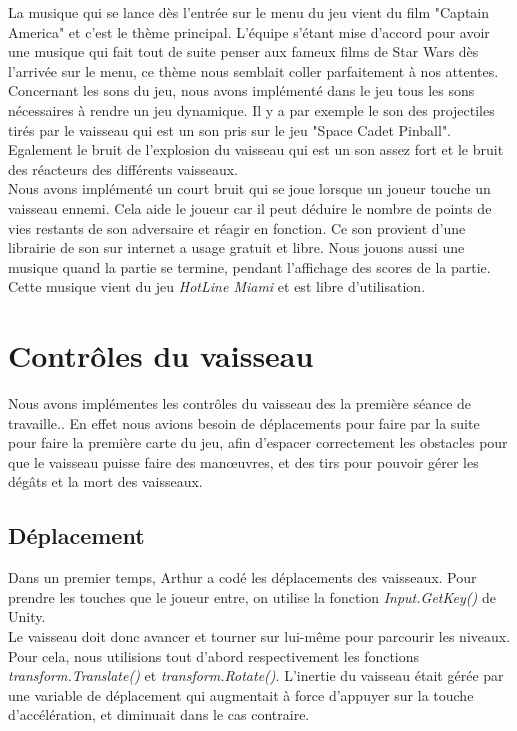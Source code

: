 \documentclass[12pt, titlepage]{article}
\begin{document}
\begin{spacing}{1.5}
La musique qui se lance dès l’entrée sur le menu du jeu vient du film "Captain America" et c’est le thème principal. L’équipe s’étant mise d’accord pour avoir une musique qui fait tout de suite penser aux fameux films de Star Wars dès l’arrivée sur le menu, ce thème nous semblait coller parfaitement à nos attentes. \\

Concernant les sons du jeu, nous avons implémenté dans le jeu tous les sons nécessaires à rendre un jeu dynamique. Il y a par exemple le son des projectiles tirés par le vaisseau qui est un son pris sur le jeu "Space Cadet Pinball". Egalement le bruit de l’explosion du vaisseau qui est un son assez fort et le bruit des réacteurs des différents vaisseaux. \\

Nous avons implémenté un court bruit qui se joue lorsque un joueur touche un vaisseau ennemi. Cela aide le joueur car il peut déduire le nombre de points de vies restants de son adversaire et réagir en fonction. Ce son provient d'une librairie de son sur internet a usage gratuit et libre. Nous jouons aussi une musique quand la partie se termine, pendant l'affichage des scores de la partie. Cette musique vient du jeu \textit{HotLine Miami} et est libre d'utilisation. \\


\newpage
\section{Contrôles du vaisseau}

Nous avons implémentes les contrôles du vaisseau des la première séance de travaille.. En effet nous avions besoin de déplacements pour faire par la suite pour faire la première carte du jeu, afin d'espacer correctement les obstacles pour que le vaisseau puisse faire des man\oe uvres, et des tirs pour pouvoir gérer les dégâts et la mort des vaisseaux.\\

\subsection{Déplacement}

Dans un premier temps, Arthur a codé les déplacements des vaisseaux. Pour prendre les touches que le joueur entre, on utilise la fonction \textit{Input.GetKey()} de Unity.\\

Le vaisseau doit donc avancer et tourner sur lui-même pour parcourir les niveaux. Pour cela, nous utilisions tout d'abord respectivement les fonctions \textit{transform.Translate()} et \textit{transform.Rotate()}. L'inertie du vaisseau était gérée par une variable de déplacement qui augmentait à force d'appuyer sur la touche d'accélération, et diminuait dans le cas contraire.\\


\end{spacing}
\end{document}
